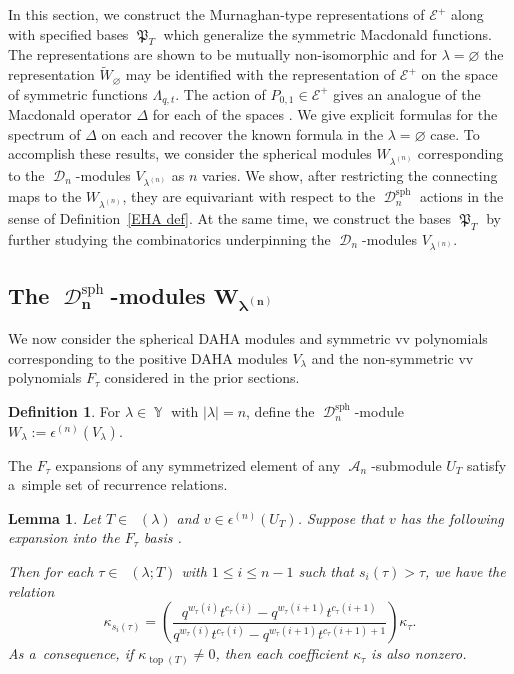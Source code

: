 \documentclass[pdftex]{sigma}
\numberwithin{equation}{section}
\newtheorem{Lemma}[Theorem]{Lemma}
\theoremstyle{definition}
\newtheorem{Definition}[Theorem]{Definition}
\DeclareMathOperator{\Par}{\mathbb{Y}}
\DeclareMathOperator{\PSYT}{\mathrm{PSYT}_{\geq 0}}
\DeclareMathOperator{\RSSYT}{\mathrm{RSSYT}_{\geq 0}}
\DeclareMathOperator{\sA}{\mathscr{A}}
\DeclareMathOperator{\sD}{\mathscr{D}}
\DeclareMathOperator{\MacD}{\mathfrak{P}}
\DeclareMathOperator{\Top}{\mathrm{top}}
\begin{document}
In this section, we construct the Murnaghan-type representations  of $\mathcal{E}^+$ along with specified bases $\MacD_{T}$ which generalize the symmetric Macdonald functions. The representations  are shown to be mutually non-isomorphic and for $\lambda = \varnothing$ the representation $\widetilde{W}_{\varnothing}$ may be identified with the representation of $\mathcal{E}^+$ on the space of symmetric functions $\Lambda_{q,t}$. The action of $P_{0,1} \in \mathcal{E}^+$ gives an analogue of the Macdonald operator $\Delta$ for each of the spaces . We give explicit formulas for the spectrum of $\Delta$ on each  and recover the known formula in the $\lambda = \varnothing$ case. To accomplish these results, we consider the spherical modules $W_{\lambda^{(n)}}$ corresponding to the $\sD_n$-modules $V_{\lambda^{(n)}}$ as $n$ varies. We show, after restricting the connecting maps  to the $W_{\lambda^{(n)}}$, they are equivariant with respect to the $\sD_n^{\mathrm{sph}}$ actions in the sense of Definition~\ref{EHA def}. At the same time, we construct the bases $\MacD_{T}$ by further studying the combinatorics underpinning the $\sD_n$-modules $V_{\lambda^{(n)}}$.

\subsection[The D\_n\^{}sph-modules W\_lambda\^{}(n)]{The $\boldsymbol{\sD_n^{\mathrm{sph}}}$-modules $\boldsymbol{W_{\lambda^{(n)}}}$}

We now consider the spherical DAHA modules and symmetric vv polynomials corresponding to the positive DAHA modules $V_{\lambda}$ and the non-symmetric vv polynomials $F_{\tau}$ considered in the prior sections.
 \begin{Definition}\label{sph DAHA reps Definition}
 For $\lambda \in \Par$ with $|\lambda| = n$, define the $\sD_n^{\mathrm{sph}}$-module $W_{\lambda}:= \epsilon^{(n)}(V_{\lambda})$.
 \end{Definition}

 The $F_{\tau}$ expansions of any symmetrized element of any $\sA_n$-submodule $U_{T}$ satisfy a~simple set of recurrence relations.

\begin{Lemma}\label{coefficient relations for sym element}
 Let $T \in \RSSYT(\lambda)$ and $v \in \epsilon^{(n)}(U_T)$. Suppose that $v$ has the following expansion into the $F_{\tau}$ basis
 \smash{$
 v = \sum_{\tau \in \PSYT(\lambda;T)} \kappa_{\tau}F_{\tau}$}.

 Then for each $\tau \in \PSYT(\lambda;T)$ with $1\leq i \leq n-1$ such that $s_i(\tau) > \tau$, we have the relation
 \[
 \kappa_{s_i(\tau)} = \left( \frac{q^{w_{\tau}(i)}t^{c_{\tau}(i)} - q^{w_{\tau}(i+1)}t^{c_{\tau}(i+1)}}{q^{w_{\tau}(i)}t^{c_{\tau}(i)} - q^{w_{\tau}(i+1)}t^{c_{\tau}(i+1)+1}} \right) \kappa_{\tau}.
 \]
 As a~consequence, if $\kappa_{\Top(T)} \neq 0$, then each coefficient $\kappa_{\tau}$ is also nonzero.
\end{Lemma}
\end{document}
